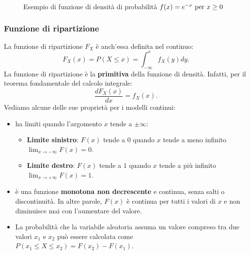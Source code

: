 \begin{figure}[h!]
    \vspace{\abovedisplayskip} 
    \centering
{}
\caption{Esempio di funzione di densità di probabilità $f(x) = e^{-x} \textnormal{ per } x \geq 0$}
\label{fig:area_va_continua}
\end{figure}


\subsubsection{Funzione di ripartizione}
La funzione di ripartizione $F_X$ è anch'essa definita nel continuo: \[ 
\boxed{
F_X(x) = P (X \leq x) = \int_{-\infty}^x f_X(y) dy
}.
\]
La funzione di ripartizione è la \textbf{primitiva} della funzione di densità. Infatti, per il teorema fondamentale del calcolo integrale: \[
\frac { d F_X(x)}{dx} = f_X(x).
\]
Vediamo alcune delle sue proprietà per i modelli continui:
\begin{itemize}
    \item ha limiti quando l'argomento $x$ tende a $\pm \infty$:
    \begin{itemize}
        \item \textbf{Limite sinistro}: $F(x)$ tende a $0$ quando $x$ tende a meno infinito $\lim_{x \rightarrow -\infty} F(x) = 0$.
        \item \textbf{Limite destro}: $F(x)$ tende a $1$ quando $x$ tende a più infinito $\lim_{x \rightarrow +\infty} F(x) = 1$.
    \end{itemize}
    \item è una funzione \textbf{monotona non decrescente} e continua, senza salti o discontinuità. In altre parole, $F(x)$ è continua per tutti i valori di $x$ e non diminuisce mai con l'aumentare del valore.
    \item La probabilità che la variabile aleatoria assuma un valore compreso tra due valori $x_1$ e $x_2$ può essere calcolata come $P(x_1 \leq X \leq x_2) = F(x_2) - F(x_1)$.
\end{itemize}


